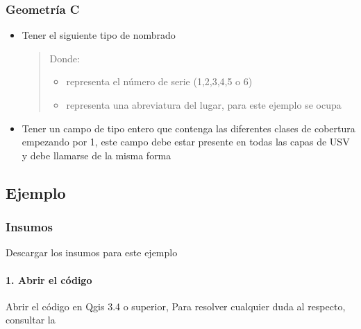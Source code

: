 \documentclass[letterpaper,10pt,spanish]{sphinxmanual}
\begin{document}
\subsubsection{Geometría C}
\label{\detokenize{nivel_geometrias:geometria-c}}\begin{itemize}
\item {} 
Tener el siguiente tipo de nombrado
\begin{quote}


Donde:
\begin{itemize}
\item {} 
\sphinxstylestrong{\#} representa el número de serie (1,2,3,4,5 o 6) 

\item {} 
 representa una abreviatura del lugar, para este ejemplo se ocupa  

\end{itemize}
\end{quote}

\item {} 
Tener un campo de tipo entero que contenga las diferentes clases de cobertura empezando por 1, este campo debe estar presente en todas las capas de USV y debe llamarse de la misma forma

\end{itemize}


\subsection{Ejemplo}
\label{\detokenize{nivel_geometrias:ejemplo}}

\subsubsection{Insumos}
\label{\detokenize{nivel_geometrias:insumos}}
Descargar los insumos para este ejemplo 


\paragraph{1. Abrir el código}
\label{\detokenize{nivel_geometrias:abrir-el-codigo}}
Abrir el código  en Qgis 3.4 o superior,
Para resolver cualquier duda al respecto, consultar la 
\end{document}
